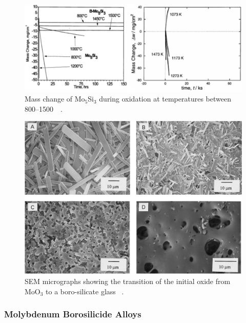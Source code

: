 % 
\begin{figure}[H]
\begin{center}
\includegraphics[width=.95\textwidth]{Mo5Si3_oxidation}
\vspace{-.3cm}
\caption{Mass change of Mo$_5$Si$_3$ during oxidation at temperatures between 800--1500\celsius\ ~\cite{akinc99}.}\label{fig:Mo5Si3_oxidation}
\end{center}
\end{figure}
\vspace{-.5cm}
%
\begin{figure}[H]
\begin{center}
\includegraphics[width=.9\textwidth]{MoSi_oxidationpictures}
\vspace{-2mm}
\caption{SEM micrographs showing the transition of the initial oxide from MoO$_3$ to a boro-silicate glass ~\cite{akinc99}.}
\label{fig:MoSi_oxidationpictures}
\end{center}
\end{figure}
\vspace{-1cm}
%

\subsubsection{Molybdenum Borosilicide Alloys}

